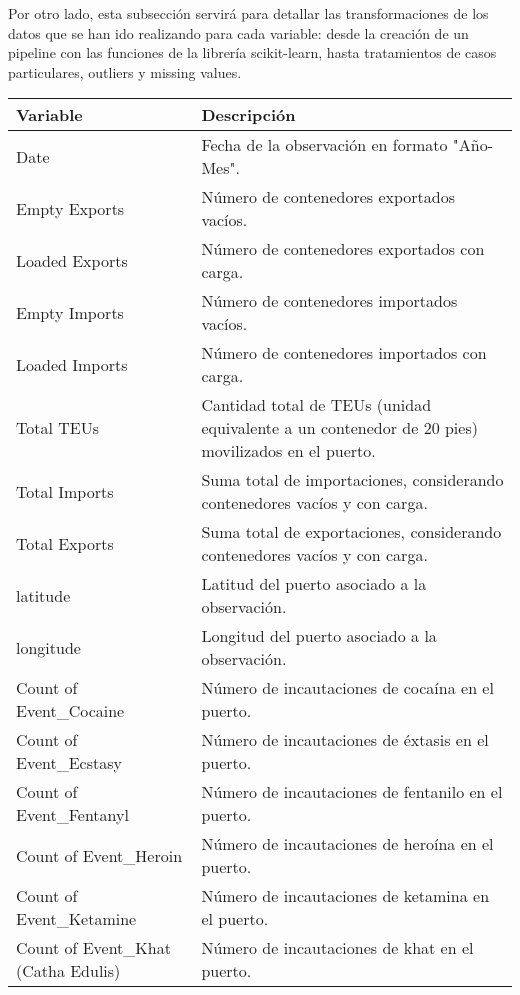 \documentclass[12pt]{article}
\begin{document}
		Por otro lado, esta subsección servirá para detallar las transformaciones de los datos que se han ido realizando para cada variable: desde la creación de un pipeline con las funciones de la librería scikit-learn, hasta tratamientos de casos particulares, outliers y missing values.
		
		\begin{table}[H]
			\centering
			\begin{tabular}{|l|p{10cm}|}
				\hline
				\textbf{Variable} & \textbf{Descripción} \\ 
				\hline
				Date & Fecha de la observación en formato "Año-Mes". \\ 
				\hline
				Empty Exports & Número de contenedores exportados vacíos. \\ 
				\hline
				Loaded Exports & Número de contenedores exportados con carga. \\ 
				\hline
				Empty Imports & Número de contenedores importados vacíos. \\ 
				\hline
				Loaded Imports & Número de contenedores importados con carga. \\ 
				\hline
				Total TEUs & Cantidad total de TEUs (unidad equivalente a un contenedor de 20 pies) movilizados en el puerto. \\ 
				\hline
				Total Imports & Suma total de importaciones, considerando contenedores vacíos y con carga. \\ 
				\hline
				Total Exports & Suma total de exportaciones, considerando contenedores vacíos y con carga. \\ 
				\hline
				latitude & Latitud del puerto asociado a la observación. \\ 
				\hline
				longitude & Longitud del puerto asociado a la observación. \\ 
				\hline
				Count of Event\_Cocaine & Número de incautaciones de cocaína en el puerto. \\ 
				\hline
				Count of Event\_Ecstasy & Número de incautaciones de éxtasis en el puerto. \\ 
				\hline
				Count of Event\_Fentanyl & Número de incautaciones de fentanilo en el puerto. \\ 
				\hline
				Count of Event\_Heroin & Número de incautaciones de heroína en el puerto. \\ 
				\hline
				Count of Event\_Ketamine & Número de incautaciones de ketamina en el puerto. \\ 
				\hline
				Count of Event\_Khat (Catha Edulis) & Número de incautaciones de khat en el puerto. \\ 

\end{tabular}
\end{table}
\end{document}
